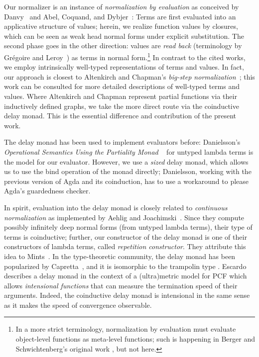 \documentclass[preliminary,copyright,creativecommons]{eptcs}
\begin{document}
Our normalizer is an instance of \emph{normalization by evaluation} as
conceived by Danvy~\cite{danvy:tdpe}
and Abel, Coquand, and
Dybjer~\cite{abelCoquandDybjer:mpc08}:
Terms
are first evaluated into an applicative structure of values; herein, we
realize function values by closures, which can be seen as weak head
normal forms under explicit substitution.  The second phase goes in
the other direction: values are \emph{read back}
(terminology by Gr\'egoire and Leroy~\cite{gregoireLeroy:icfp02})
as terms in normal form.\footnote{In a more strict terminology, normalization by evaluation must
  evaluate object-level functions as meta-level functions;  such is
  happening in Berger and Schwichtenberg's original work
  \cite{bergerSchwichtenberg:lics91}, but not here.
}
In contrast to the cited works, we employ
intrinsically well-typed representations of terms and values.  In
fact, our approach is closest to Altenkirch and Chapman's
\emph{big-step normalization}~\cite{altenkirchChapman:bigStepNormalisation,chapman:PhD};
this work can be consulted for more detailed descriptions of
well-typed terms and values.  Where Altenkirch and Chapman
represent partial functions via their inductively defined graphs, we
take the more direct route via the coinductive delay monad.  This is
the essential difference and contribution of the present work.

The delay monad has been used to implement evaluators before:
Danielsson's \emph{Operational Semantics Using the Partiality Monad}
~\cite{danielsson:icfp12} for untyped lambda terms is the model for
our evaluator.  However, we use a \emph{sized} delay monad, which
allows us to use the bind operation of the monad directly;
Danielsson, working with the previous version of Agda and its
coinduction, has to use a workaround to please Agda's guardedness
checker.

In spirit, evaluation into the delay monad is closely related to
\emph{continuous normalization} as implemented by Aehlig and
Joachimski~\cite{aehligJoachimski:continuousNormalization}.  Since
they compute possibly infinitely deep normal forms (from untyped
lambda terms), their type of terms is coinductive; further, our
 constructor of the delay monad is one of their
constructors of lambda terms, called \emph{repetition constructor}.
They attribute this idea to Mints~\cite{mints:contNorm}.  In the
type-theoretic community, the delay monad has been popularized by
Capretta~\cite{capretta:generalRecursionViaCoinductiveTypes}, and it
is isomorphic to the trampolin type \cite{ganzFriedmanWand:icfp99}.
Escardo~\cite{escardo:metricPCF} describes a delay monad in the
context of a (ultra)metric model for PCF which allows
\emph{intensional functions} that can measure the termination speed of
their arguments.  Indeed, the coinductive delay monad is intensional
in the same sense as it makes the speed of convergence observable.
\end{document}

